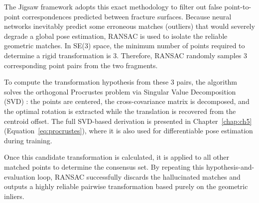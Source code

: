 The Jigsaw framework adopts this exact methodology to filter out false point-to-point correspondences predicted between fracture surfaces. Because neural networks inevitably predict some erroneous matches (outliers) that would severely degrade a global pose estimation, RANSAC is used to isolate the reliable geometric matches. In SE(3) space, the minimum number of points required to determine a rigid transformation is 3. Therefore, RANSAC randomly samples 3 corresponding point pairs from the two fragments.

To compute the transformation hypothesis from these 3 pairs, the algorithm solves the orthogonal Procrustes problem via Singular Value Decomposition (SVD) \cite{golub2013matrix}: the points are centered, the cross-covariance matrix is decomposed, and the optimal rotation is extracted while the translation is recovered from the centroid offset. The full SVD-based derivation is presented in Chapter~\ref{chap:ch5} (Equation~\ref{eq:procrustes}), where it is also used for differentiable pose estimation during training.

Once this candidate transformation is calculated, it is applied to all other matched points to determine the consensus set. By repeating this hypothesis-and-evaluation loop, RANSAC successfully discards the hallucinated matches and outputs a highly reliable pairwise transformation based purely on the geometric inliers.
